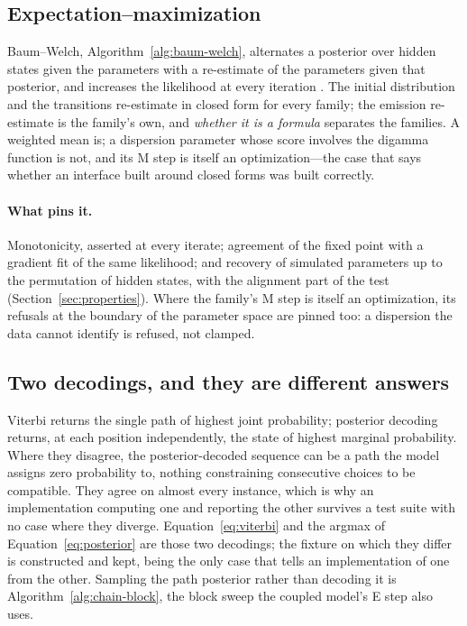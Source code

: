 \documentclass[11pt,a4paper]{article}
\begin{document}
\subsection{Expectation--maximization}
Baum--Welch, Algorithm~\ref{alg:baum-welch}, alternates a posterior over
hidden states given the parameters with a re-estimate of the parameters given
that posterior, and increases the likelihood at every iteration
\citep{mackay2003}. The initial distribution and the transitions re-estimate in
closed form for every family; the emission re-estimate is the family's own, and
\emph{whether it is a formula} separates the families. A weighted mean is; a
dispersion parameter whose score involves the digamma function is not, and its
M step is itself an optimization---the case that says whether an interface
built around closed forms was built correctly.

\paragraph{What pins it.}
Monotonicity, asserted at every iterate; agreement of the fixed point with a
gradient fit of the same likelihood; and recovery of simulated parameters up
to the permutation of hidden states, with the alignment part of the test
(Section~\ref{sec:properties}). Where the family's M step is itself an
optimization, its refusals at the boundary of the parameter space are pinned
too: a dispersion the data cannot identify is refused, not clamped.

\subsection{Two decodings, and they are different answers}
Viterbi returns the single path of highest joint probability; posterior
decoding returns, at each position independently, the state of highest marginal
probability. Where they disagree, the posterior-decoded sequence can be a path
the model assigns zero probability to, nothing constraining consecutive choices
to be compatible. They agree on almost every instance, which is why an
implementation computing one and reporting the other survives a test suite with
no case where they diverge. Equation~\ref{eq:viterbi} and the argmax of
Equation~\ref{eq:posterior} are those two decodings; the fixture on which they
differ is constructed and kept, being the only case that tells an
implementation of one from the other. Sampling the path posterior rather than
decoding it is Algorithm~\ref{alg:chain-block}, the block sweep the coupled
model's E step also uses.
\end{document}
